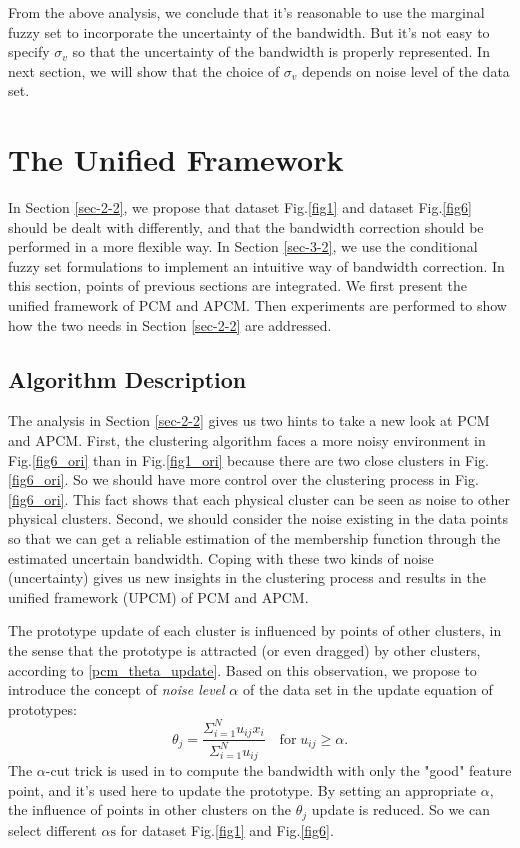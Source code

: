 \documentclass[journal]{IEEEtran}
\theoremstyle{definition}
\begin{document}
From the above analysis, we conclude that it's reasonable to use the marginal fuzzy set to incorporate the uncertainty of the bandwidth. But it's not easy to specify $\sigma_v$ so that the uncertainty of the bandwidth is properly represented. In next section, we will show that the choice of $\sigma_v$ depends on noise level of the data set.
\section{The Unified Framework}
\label{sec-4}
In Section \ref{sec-2-2}, we propose that dataset Fig.\ref{fig1} and dataset Fig.\ref{fig6} should be dealt with differently, and that the bandwidth correction should be performed in a more flexible way. In Section \ref{sec-3-2}, we use the conditional fuzzy set formulations to implement an intuitive way of bandwidth correction. In this section, points of previous sections are integrated. We first present the unified framework of PCM and APCM. Then experiments are performed to show how the two needs in Section \ref{sec-2-2} are addressed.
\subsection{Algorithm Description}
\label{sec-4-1}
The analysis in Section \ref{sec-2-2} gives us two hints to take a new look at PCM and APCM. 
First, the clustering algorithm faces a more noisy environment in Fig.\ref{fig6_ori} than in Fig.\ref{fig1_ori} because there are two close clusters in Fig.\ref{fig6_ori}. So we should have more control over the clustering process in Fig.\ref{fig6_ori}. This fact shows that each physical cluster can be seen as noise to other physical clusters.
Second, we should consider the noise existing in the data points so that we can get a reliable estimation of the membership function through the estimated uncertain bandwidth.  
Coping with these two kinds of noise (uncertainty) gives us new insights in the clustering process and results in the unified framework (UPCM) of PCM and APCM.

The prototype update of each cluster is influenced by points of other clusters, in the sense that the prototype is attracted (or even dragged) by other clusters, according to \eqref{pcm_theta_update}.
Based on this observation, we propose to introduce the concept of \emph{noise level} $\alpha$ of the data set in the update equation of prototypes:
\begin{equation}
\label{upcm_theta_update}
\theta_j=\frac{\Sigma_{i=1}^Nu_{ij}x_i}{\Sigma_{i=1}^Nu_{ij}} \quad \text{for}\;u_{ij}\geq \alpha.
\end{equation}
The $\alpha\text{-cut}$ trick is used in \cite{krishnapuram_possibilistic_1993} to compute the bandwidth with only the "good" feature point, and it's used here to update the prototype. By setting an appropriate $\alpha$, the influence of points in other clusters on the $\theta_j$ update is reduced. So we can select different $\alpha\text{s}$ for dataset Fig.\ref{fig1} and Fig.\ref{fig6}.
\end{document}
